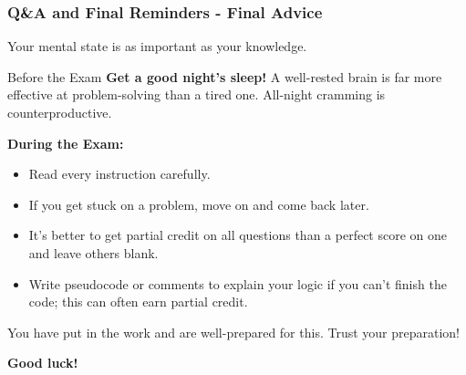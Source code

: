 \documentclass{beamer}
\begin{document}
\begin{frame}[fragile]
    \frametitle{Q\&A and Final Reminders - Final Advice}
    Your mental state is as important as your knowledge.

    \begin{block}{Before the Exam}
        \textbf{Get a good night's sleep!} A well-rested brain is far more effective at problem-solving than a tired one. All-night cramming is counterproductive.
    \end{block}
    
    \textbf{During the Exam:}
    \begin{itemize}
        \item Read every instruction carefully.
        \item If you get stuck on a problem, move on and come back later.
        \item It's better to get partial credit on all questions than a perfect score on one and leave others blank.
        \item Write pseudocode or comments to explain your logic if you can't finish the code; this can often earn partial credit.
    \end{itemize}
    \vspace{1em}
    You have put in the work and are well-prepared for this. Trust your preparation!
    
    \begin{center}
        \Large\textbf{Good luck!}
    \end{center}
\end{frame}
\end{document}

